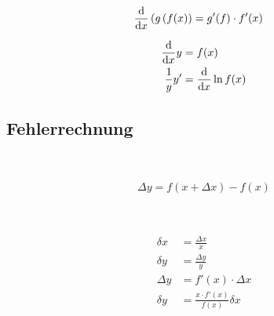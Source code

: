 \begin{boxleft}
\end{boxleft}\begin{boxrightshaded}
 \begin{align} 
\frac{\mathop{}\!\mathrm{d} }{\mathop{}\!\mathrm{d} x}\left(g\left( f(x\right)\right)&=g'(f)\cdot f'(x)
 \end{align}\end{boxrightshaded}
                 
\begin{boxleft}
\end{boxleft}\begin{boxrightshaded}
 \begin{align} 
\frac{\mathop{}\!\mathrm{d} }{\mathop{}\!\mathrm{d} x}y&=f(x)\\
\frac{1}{y}y'&=\frac{\mathop{}\!\mathrm{d} }{\mathop{}\!\mathrm{d} x}\ln{f(x)}
 \end{align}\end{boxrightshaded}
                   
\subsection{Fehlerrechnung}

\begin{boxleft}
\\
\end{boxleft}\begin{boxrightshaded}
\begin{align} 
\Delta y=f(x+\Delta x)-f(x)
\end{align}\end{boxrightshaded}
         
\begin{boxleft}
\\
\end{boxleft}\begin{boxrightshaded}
\begin{align} 
\delta x&=\frac{\Delta x}{x}\\
\delta y&=\frac{\Delta y}{y}\\
\Delta y&=f'(x)\cdot \Delta x\\
\delta y&=\frac{x\cdot f'(x)}{f(x)}\delta x
\end{align}\end{boxrightshaded}
         
